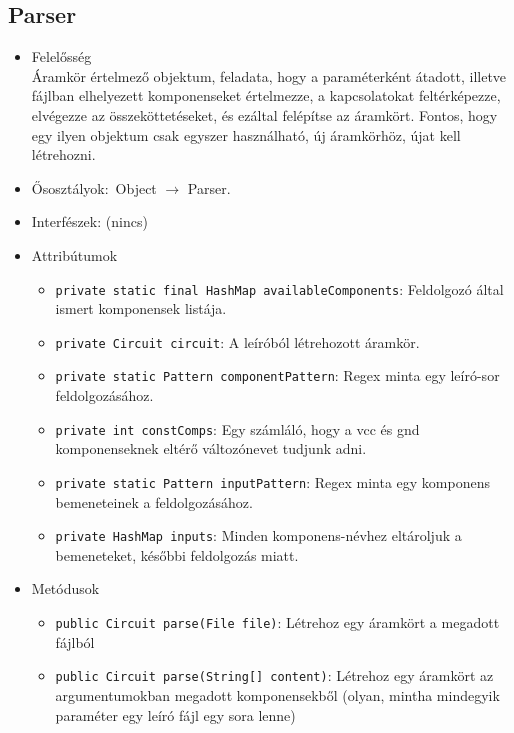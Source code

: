 \subsection{Parser}
\begin{itemize}
\item Felelősség\\
Áramkör értelmező objektum, feladata, hogy a paraméterként átadott, illetve  fájlban elhelyezett komponenseket értelmezze, a kapcsolatokat feltérképezze,  elvégezze az összeköttetéseket, és ezáltal felépítse az áramkört. Fontos, hogy egy ilyen objektum csak egyszer használható, új áramkörhöz, újat kell létrehozni.
\item Ősosztályok:\ Object $\rightarrow{}$ Parser.
\item Interfészek: (nincs)
\item Attribútumok $\ $
\begin{itemize}
	\item \texttt{private static final HashMap availableComponents}: Feldolgozó által ismert komponensek listája.
	\item \texttt{private Circuit circuit}: A leíróból létrehozott áramkör.
	\item \texttt{private static Pattern componentPattern}: Regex minta egy leíró-sor feldolgozásához.
	\item \texttt{private int constComps}: Egy számláló, hogy a vcc és gnd komponenseknek eltérő változónevet tudjunk adni.
	\item \texttt{private static Pattern inputPattern}: Regex minta egy komponens bemeneteinek a feldolgozásához.
	\item \texttt{private HashMap inputs}: Minden komponens-névhez eltároljuk a bemeneteket, későbbi feldolgozás miatt.
\end{itemize}
\item Metódusok$\ $
\begin{itemize}
	\item \texttt{public Circuit parse(File file)}: Létrehoz egy áramkört a megadott fájlból
	\item \texttt{public Circuit parse(String[] content)}: Létrehoz egy áramkört az argumentumokban megadott komponensekből (olyan, mintha mindegyik paraméter egy leíró fájl egy sora lenne)
\end{itemize}
\end{itemize}

